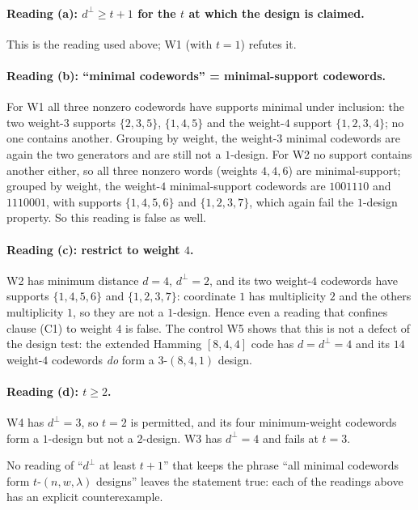 \documentclass[11pt]{article}
\theoremstyle{definition}
\theoremstyle{remark}
\newcommand{\dperp}{d^{\perp}}
\begin{document}
\paragraph{Reading (a): $\dperp \ge t+1$ for the $t$ at which the design is
claimed.} This is the reading used above; W1 (with $t=1$) refutes it.

\paragraph{Reading (b): ``minimal codewords'' = minimal-support codewords.}
For W1 all three nonzero codewords have supports minimal under inclusion: the
two weight-$3$ supports $\{2,3,5\}$, $\{1,4,5\}$ and the weight-$4$ support
$\{1,2,3,4\}$; no one contains another. Grouping by weight, the weight-$3$
minimal codewords are again the two generators and are still not a $1$-design.
For W2 no support contains another either, so all three nonzero words (weights
$4,4,6$) are minimal-support; grouped by weight, the weight-$4$ minimal-support
codewords are $1001110$ and $1110001$, with supports $\{1,4,5,6\}$ and
$\{1,2,3,7\}$, which again fail the $1$-design property. So this reading is
false as well.

\paragraph{Reading (c): restrict to weight $4$.} W2 has minimum distance
$d = 4$, $\dperp = 2$, and its two weight-$4$ codewords have supports
$\{1,4,5,6\}$ and $\{1,2,3,7\}$: coordinate $1$ has multiplicity $2$ and the
others multiplicity $1$, so they are not a $1$-design. Hence even a reading that
confines clause (C1) to weight $4$ is false. The control W5 shows that this is
not a defect of the design test: the extended Hamming $[8,4,4]$ code has
$d = \dperp = 4$ and its $14$ weight-$4$ codewords \emph{do} form a
$3$-$(8,4,1)$ design.

\paragraph{Reading (d): $t \ge 2$.} W4 has $\dperp = 3$, so $t = 2$ is
permitted, and its four minimum-weight codewords form a $1$-design but not a
$2$-design. W3 has $\dperp = 4$ and fails at $t = 3$.

No reading of ``$\dperp$ at least $t+1$'' that keeps the phrase
``all minimal codewords form $t$-$(n,w,\lambda)$ designs'' leaves the statement
true: each of the readings above has an explicit counterexample.
\end{document}
